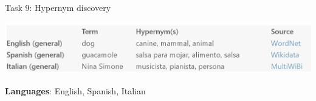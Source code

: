 \documentclass[10pt, compress]{beamer}
\begin{document}
\begin{frame}{Task 9: Hypernym discovery}
\begin{center}
\includegraphics[width=\textwidth]{graphics/hypernyms-examples.png}
\end{center}

\textbf{Languages}: English, Spanish, Italian

\end{frame}



\end{document}
